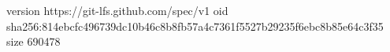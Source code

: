 version https://git-lfs.github.com/spec/v1
oid sha256:814ebcfc496739dc10b46c8b8fb57a4c7361f5527b29235f6ebc8b85e64c3f35
size 690478
